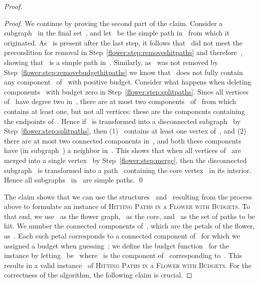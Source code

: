 \let\accentvec\vec  \documentclass{llncs}
\newcommand{\claimqed}{\renewcommand{\squareforqed}{}\qed\renewcommand{\squareforqed}{\plainsquareforqed}}
\newcommand{\HitPathsInFlower}{\textsc{Hitting Paths in a Flower with Budgets}\xspace}
\begin{document}
\begin{proof}
\begin{proof}
We continue by proving the second part of the claim. Consider a subgraph~ in the final set~, and let~ be the simple path in~ from which it originated. As~ is present after the last step, it follows that~ did not meet the precondition for removal in Step~\ref{flower:step:removeshitpaths} and therefore~, showing that~ is a simple path in~. Similarly, as~ was not removed by Step~\ref{flower:step:removebudgethitpaths} we know that~ does not fully contain any component~ of~ with positive budget. Consider what happens when deleting components~ with budget zero in Step~\ref{flower:step:splitpaths}. Since all vertices of~ have degree two in~, there are at most two components~ of~ from which~ contains at least one, but not all vertices: these are the components containing the endpoints of~. Hence if~ is transformed into a disconnected subgraph~ by Step~\ref{flower:step:splitpaths}, then (1)~ contains at least one vertex of~, and (2) there are at most two connected components in~, and both these components have (in subgraph~) a neighbor in~. This shows that when all vertices of~ are merged into a single vertex~ by Step~\ref{flower:step:merge}, then the disconnected subgraph~ is transformed into a path~ containing the core vertex~ in its interior. Hence all subgraphs~ in~ are simple paths.
\claimqed
\end{proof}

The claim shows that we can use the structures~ and~ resulting from the process above to formulate an instance of \HitPathsInFlower. To that end, we use~ as the flower graph,~ as the core, and~ as the set of paths to be hit. We number the connected components of~, which are the petals of the flower, as~. Each such petal corresponds to a connected component of~ for which we assigned a budget when guessing~; we define the budget function~ for the instance by letting~ be~ where~ is the component of~ corresponding to~. This results in a valid instance~ of \HitPathsInFlower. For the correctness of the algorithm, the following claim is crucial.


\end{proof}
\end{document}
